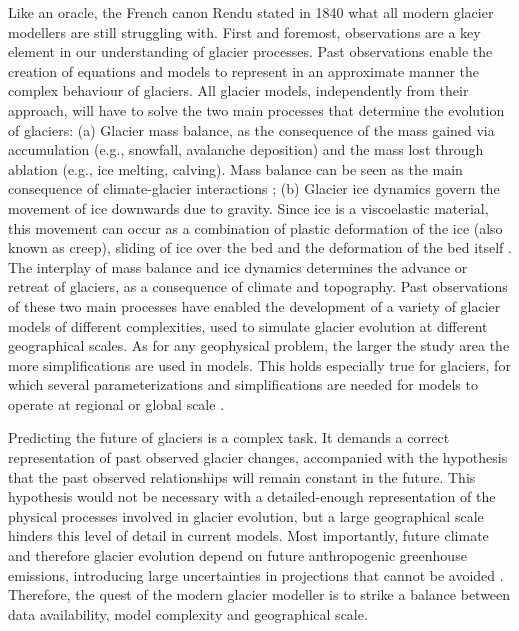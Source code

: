 Like an oracle, the French canon Rendu stated in 1840 what all modern glacier modellers are still struggling with. First and foremost, observations are a key element in our understanding of glacier processes. Past observations enable the creation of equations and models to represent in an approximate manner the complex behaviour of glaciers. All glacier models, independently from their approach, will have to solve the two main processes that determine the evolution of glaciers: (a) Glacier mass balance, as the consequence of the mass gained via accumulation (e.g., snowfall, avalanche deposition) and the mass lost through ablation (e.g., ice melting, calving). Mass balance can be seen as the main consequence of climate-glacier interactions \citep{benn_glaciers_2014}; (b) Glacier ice dynamics govern the movement of ice downwards due to gravity. Since ice is a viscoelastic material, this movement can occur as a combination of plastic deformation of the ice (also known as creep), sliding of ice over the bed and the deformation of the bed itself \citep{cuffey_physics_2010}. The interplay of mass balance and ice dynamics determines the advance or retreat of glaciers, as a consequence of climate and topography. Past observations of these two main processes have enabled the development of a variety of glacier models of different complexities, used to simulate glacier evolution at different geographical scales. As for any geophysical problem, the larger the study area the more simplifications are used in models. This holds especially true for glaciers, for which several parameterizations and simplifications are needed for models to operate at regional or global scale \citep[e.g.,][]{marzeion_past_2012, huss_new_2015, maussion_open_2019}. 

Predicting the future of glaciers is a complex task. It demands a correct representation of past observed glacier changes, accompanied with the hypothesis that the past observed relationships will remain constant in the future. This hypothesis would not be necessary with a detailed-enough representation of the physical processes involved in glacier evolution, but a large geographical scale hinders this level of detail in current models. Most importantly, future climate and therefore glacier evolution depend on future anthropogenic greenhouse emissions, introducing large uncertainties in projections that cannot be avoided \citep{marzeion_partitioning_2020}. Therefore, the quest of the modern glacier modeller is to strike a balance between data availability, model complexity and geographical scale.

